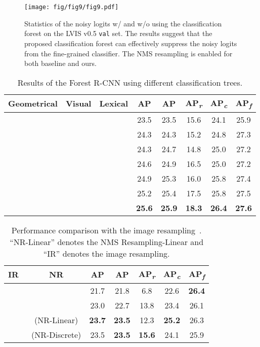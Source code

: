 \documentclass[sigconf]{acmart}
\begin{document}
\begin{figure}
	\centering
	\texttt{[image: fig/fig9/fig9.pdf]}
	\vspace{-5mm}
	\caption{Statistics of the noisy logits w/ and w/o using the classification forest on the LVIS v0.5 \texttt{val} set. The results suggest that the proposed classification forest can effectively suppress the noisy logits from the fine-grained classifier. The NMS resampling is enabled for both baseline and ours.}
	\vspace{-1mm}
	\label{fig:noisy_logits_comparison}
\end{figure}

\begin{table}
	\centering
	\caption{Results of the Forest R-CNN using different classification trees.}
	\vspace{-3mm}
	\label{tab:classifcation_forest}
	\setlength{\tabcolsep}{4pt}
	\begin{tabular}{ccc|cc|ccc}
		Geometrical&Visual&Lexical&AP&AP& AP\textsubscript{\textit{r}} & AP\textsubscript{\textit{c}} & AP\textsubscript{\textit{f}}\\
		\toprule[1.3pt]
		
		& &  &23.5&23.5&15.6 &24.1 &25.9\\
		\Checkmark&&&24.3&24.3&15.2&24.8&27.3\\
		& \Checkmark&&24.3&24.7&14.8 & 25.0 & 27.2\\	
		& &\Checkmark&24.6&24.9&16.5&25.0&27.2\\
		&\Checkmark&\Checkmark&24.9&25.3&16.0&25.8&27.4\\	
		\Checkmark&\Checkmark&&25.2&25.4&17.5&25.8&27.5\\	
		\Checkmark&\Checkmark&\Checkmark&\bf25.6&\bf25.9&\bf18.3&\bf26.4 &\bf27.6
	\end{tabular}
\vspace{-3mm}
\end{table}

\begin{table}
	\centering
	\caption{Performance comparison with the image resampling~\cite{lvis}. ``NR-Linear'' denotes the NMS Resampling-Linear and ``IR'' denotes the image resampling.}
	\vspace{-3mm}
	\label{tab:resample_comparision}
	\begin{tabular}{cc|c c| c c c}
		IR~\cite{lvis}& NR & AP& AP & AP\textsubscript{\textit{r}} & AP\textsubscript{\textit{c}} & AP\textsubscript{\textit{f}}\\
		\toprule[1.3pt]
		
		&	&  21.7 & 21.8  & 6.8 & 22.6 &\bf 26.4  \\
		\Checkmark & & 23.0&22.7  &13.8  &23.4  &26.1 \\
		
		& \Checkmark({\small NR-Linear}) & \bf 23.7&\bf23.5&12.3 &\bf25.2& 26.3 \\
		
		& \Checkmark({\small NR-Discrete}) &23.5 &\bf23.5&\bf15.6 &24.1 &25.9 \\
		
	\end{tabular}
\vspace{-3mm}
\end{table}
\end{document}

